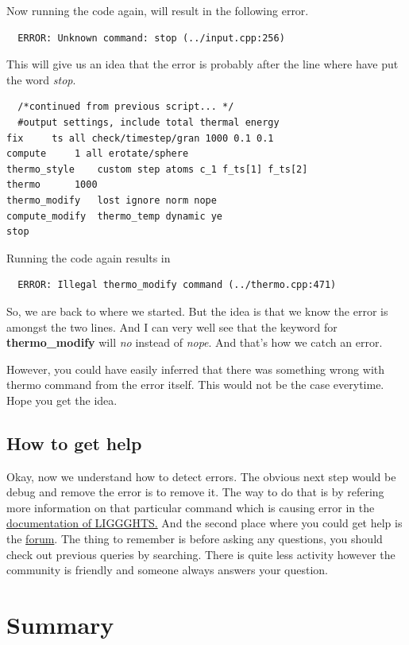 \documentclass{tufte-book} %
\begin{document}
Now running the code again, will result in the following error.

\begin{verbatim}
  ERROR: Unknown command: stop (../input.cpp:256)

\end{verbatim}
This will give us an idea that the error is probably after the line where have put the word \textit{stop}.
\begin{verbatim}
  /*continued from previous script... */
  #output settings, include total thermal energy
fix		ts all check/timestep/gran 1000 0.1 0.1
compute		1 all erotate/sphere
thermo_style	custom step atoms c_1 f_ts[1] f_ts[2]  
thermo		1000
thermo_modify	lost ignore norm nope
compute_modify	thermo_temp dynamic ye
stop
  \end{verbatim}

Running the code again results in
\begin{verbatim}
  ERROR: Illegal thermo_modify command (../thermo.cpp:471)
\end{verbatim}

So, we are back to where we started. But the idea is that we know the error is amongst the two lines. And I can very well see that the keyword for \textbf{thermo\_modify} will \emph{no} instead of \textit{nope}. And that's how we catch an error.

However, you could have easily inferred that there was something wrong with thermo command from the error itself. This would not be the case everytime. Hope you get the idea.

\subsection{How to get help}

Okay, now we understand how to detect errors. The obvious next step would be debug and remove the error is to remove it. The way to do that is by refering more information on that particular command which is causing error in the \href{http://www.cfdem.com/media/DEM/docu/Section_commands.html#comm}{documentation of LIGGGHTS.}
And the second place where you could get help is the \href{http://www.cfdem.com/forum}{forum}. The thing to remember is before asking any questions, you should check out previous queries by searching. There is quite less activity however the community is friendly and someone always answers your question.

\section{Summary}
\end{document}
